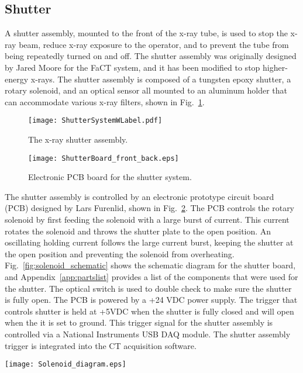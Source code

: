 \subsection{Shutter}
A shutter assembly, mounted to the front of the x-ray tube, is used to stop the x-ray beam, reduce x-ray exposure to the operator, and to prevent the tube from being repeatedly turned on and off.  The shutter assembly was originally designed by Jared Moore for the FaCT system, and it has been modified to stop higher-energy x-rays.  The shutter assembly is composed of a tungsten epoxy shutter, a rotary solenoid, and an optical sensor all mounted to an aluminum holder that can accommodate various x-ray filters, shown in Fig.~\ref{fig:shutter}.
%
\begin{figure}[h]
\centering
	\texttt{[image: ShutterSystemWLabel.pdf]}
	\caption{The x-ray shutter assembly.}
	\label{fig:shutter}
\end{figure}

\begin{figure}
\centering
\texttt{[image: ShutterBoard\_front\_back.eps]}
\caption{Electronic PCB board for the shutter system.}
\label{fig:shutterboard}
\end{figure}

The shutter assembly is controlled by an electronic prototype circuit board (PCB) designed by Lars Furenlid, shown in Fig.~\ref{fig:shutterboard}.  The PCB controls the rotary solenoid by first feeding the solenoid with a large burst of current.  This current rotates the solenoid and throws the shutter plate to the open position.  An oscillating holding current follows the large current burst, keeping the shutter at the open position and preventing the solenoid from overheating.  Fig.~\ref{fig:solenoid_schematic} shows the schematic diagram for the shutter board, and Appendix~\ref{app:partslist} provides a list of the components that were used for the shutter.  The optical switch is used to double check to make sure the shutter is fully open.  The PCB is powered by a +24 VDC power supply.  The trigger that controls shutter is held at +5VDC when the shutter is fully closed and will open when the it is set to ground.  This trigger signal for the shutter assembly is controlled via a National Instruments USB DAQ module.  The shutter assembly trigger is integrated into the CT acquisition software.
%
\begin{sidewaysfigure}[h]
\centering
\texttt{[image: Solenoid\_diagram.eps]}
\caption{Schematic for the solenoid PCB board}
\label{fig:solenoid_schematic}
\end{sidewaysfigure}
		
